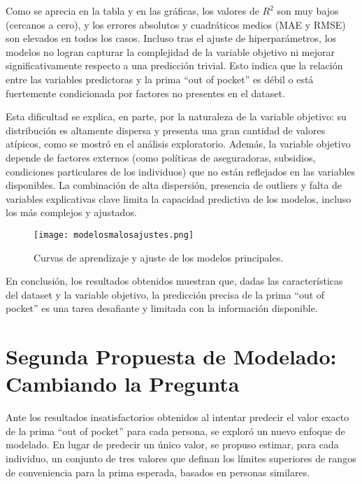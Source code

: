 \documentclass[12pt]{article}
\begin{document}
Como se aprecia en la tabla y en las gráficas, los valores de $R^2$ son muy bajos (cercanos a cero), y los errores absolutos y cuadráticos medios (MAE y RMSE) son elevados en todos los casos. Incluso tras el ajuste de hiperparámetros, los modelos no logran capturar la complejidad de la variable objetivo ni mejorar significativamente respecto a una predicción trivial. Esto indica que la relación entre las variables predictoras y la prima “out of pocket” es débil o está fuertemente condicionada por factores no presentes en el dataset.

Esta dificultad se explica, en parte, por la naturaleza de la variable objetivo: su distribución es altamente dispersa y presenta una gran cantidad de valores atípicos, como se mostró en el análisis exploratorio. Además, la variable objetivo depende de factores externos (como políticas de aseguradoras, subsidios, condiciones particulares de los individuos) que no están reflejados en las variables disponibles. La combinación de alta dispersión, presencia de outliers y falta de variables explicativas clave limita la capacidad predictiva de los modelos, incluso los más complejos y ajustados.

\begin{figure}
    \centering
    \texttt{[image: modelosmalosajustes.png]}
    \caption{Curvas de aprendizaje y ajuste de los modelos principales.}
\end{figure}

En conclusión, los resultados obtenidos muestran que, dadas las características del dataset y la variable objetivo, la predicción precisa de la prima “out of pocket” es una tarea desafiante y limitada con la información disponible.

\vspace{3cm}
\section{Segunda Propuesta de Modelado: Cambiando la Pregunta}
Ante los resultados insatisfactorios obtenidos al intentar predecir el valor exacto de la prima “out of pocket” para cada persona, se exploró un nuevo enfoque de modelado. En lugar de predecir un único valor, se propuso estimar, para cada individuo, un conjunto de tres valores que definan los límites superiores de rangos de conveniencia para la prima esperada, basados en personas similares.
\end{document}
